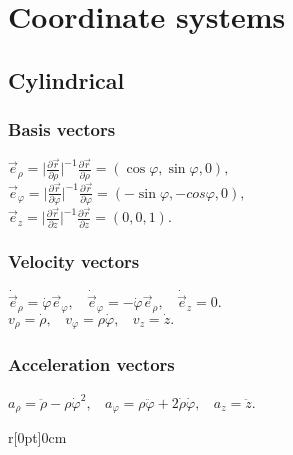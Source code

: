 \section{Coordinate systems}



\subsection{Cylindrical}



\subsubsection*{Basis vectors}

 $\vec{e}_\rho=\Big|\frac{\partial \vec{r}}{\partial \rho}\Big|^{-1}\frac{\partial \vec{r}}{\partial \rho}=(\cos\varphi,\sin\varphi,0), $\\$
                    \vec{e}_\varphi =\Big|\frac{\partial \vec{r}}{\partial \varphi}\Big|^{-1}\frac{\partial \vec{r}}{\partial \varphi}=(-\sin\varphi,-cos\varphi,0), $\\$
                    \vec{e}_z =\Big|\frac{\partial \vec{r}}{\partial
                    z}\Big|^{-1}\frac{\partial \vec{r}}{\partial z}=(0,0,1). $
                    
                    
                    
\subsubsection*{Velocity vectors}
                    $\dot{\vec{e}}_\rho =\dot{\varphi}\vec{e}_\varphi,\ \ \ \ \dot{\vec{e}}_\varphi=-\dot{\varphi}\vec{e}_\rho,\ \ \ \ \dot{\vec{e}}_z=0. $\\$
                    v_\rho =\dot{\rho},\ \ \ \ v_\varphi=\rho\dot{\varphi},\ \ \ \ v_z=\dot{z}. $\\
                    
                    
                    
\subsubsection*{Acceleration vectors}
                    $a_\rho =\ddot{\rho}-\rho\dot{\varphi}^2,\ \ \ \ a_\varphi=\rho\ddot{\varphi}+2\dot{\rho}\dot{\varphi},\ \ \ \ a_z=\ddot{z}$.\\
                        \begin{wrapfigure}[0]{r}[0pt]{0cm}

    \end{wrapfigure}



